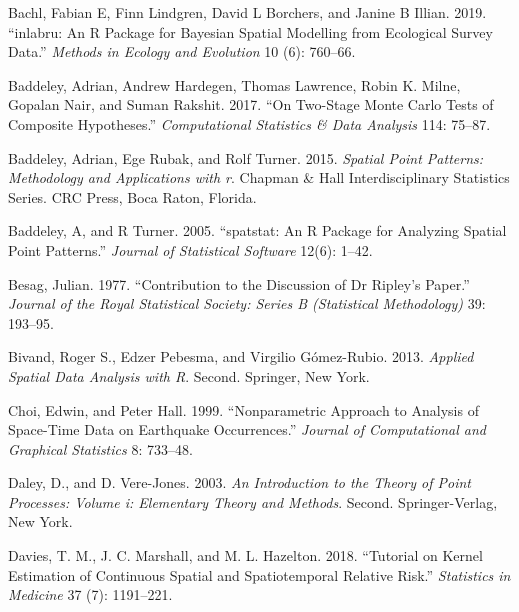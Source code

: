 \hypertarget{refs}{}
\begin{CSLReferences}{1}{0}
\leavevmode{}%
Bachl, Fabian E, Finn Lindgren, David L Borchers, and Janine B Illian. 2019. {``{inlabru}: An {R} Package for {B}ayesian Spatial Modelling from Ecological Survey Data.''} \emph{Methods in Ecology and Evolution} 10 (6): 760--66.

\leavevmode{}%
Baddeley, Adrian, Andrew Hardegen, Thomas Lawrence, Robin K. Milne, Gopalan Nair, and Suman Rakshit. 2017. {``On Two-Stage {M}onte {C}arlo Tests of Composite Hypotheses.''} \emph{Computational Statistics \& Data Analysis} 114: 75--87.

\leavevmode{}%
Baddeley, Adrian, Ege Rubak, and Rolf Turner. 2015. \emph{Spatial Point Patterns: Methodology and Applications with r}. Chapman \& Hall Interdisciplinary Statistics Series. CRC Press, Boca Raton, Florida.

\leavevmode{}%
Baddeley, A, and R Turner. 2005. {``{spatstat}: An {R} Package for Analyzing Spatial Point Patterns.''} \emph{Journal of Statistical Software} 12(6): 1--42.

\leavevmode{}%
Besag, Julian. 1977. {``Contribution to the Discussion of Dr {R}ipley's Paper.''} \emph{Journal of the Royal Statistical Society: Series B (Statistical Methodology)} 39: 193--95.

\leavevmode{}%
Bivand, Roger S., Edzer Pebesma, and Virgilio Gómez-Rubio. 2013. \emph{Applied Spatial Data Analysis with {R}}. Second. Springer, New York.

\leavevmode{}%
Choi, Edwin, and Peter Hall. 1999. {``Nonparametric Approach to Analysis of Space-Time Data on Earthquake Occurrences.''} \emph{Journal of Computational and Graphical Statistics} 8: 733--48.

\leavevmode{}%
Daley, D., and D. Vere-Jones. 2003. \emph{An Introduction to the Theory of Point Processes: Volume i: Elementary Theory and Methods}. Second. Springer-Verlag, New York.

\leavevmode{}%
Davies, T. M., J. C. Marshall, and M. L. Hazelton. 2018. {``Tutorial on Kernel Estimation of Continuous Spatial and Spatiotemporal Relative Risk.''} \emph{Statistics in Medicine} 37 (7): 1191--221.


\end{CSLReferences}
